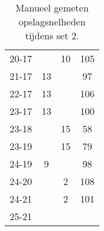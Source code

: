 \begin{table}[ht!]
\begin{tabular}{|c|c|c|c|}
    20-17 &  & 10 & 105 \\
    21-17 & 13 &  & 97 \\
    22-17 & 13 &  & 106 \\
    23-17 & 13 &  & 100 \\
    23-18 &  & 15 & 58 \\
    23-19 &  & 15 & 79 \\
    24-19 & 9 &  & 98 \\
    24-20 &  & 2 & 108 \\
    24-21 &  & 2 & 101 \\
    25-21 &  &  &  \\ \hline
  \end{tabular}
  \caption[Manueel gemeten opslagsnelheden tijdens set 2]{\label{tab:PL1ServeMan2}Manueel gemeten opslagsnelheden tijdens set 2.}
\end{table}

